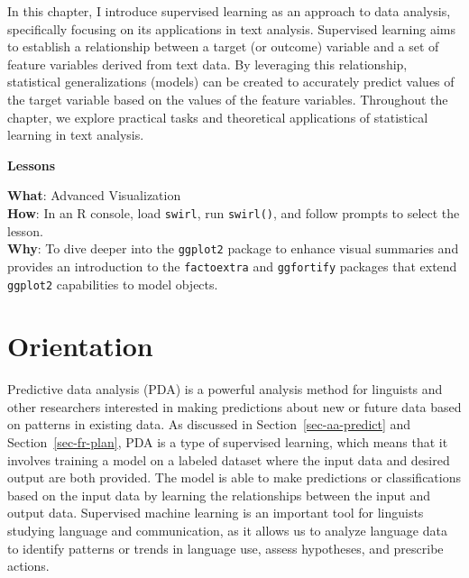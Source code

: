 \documentclass[
  letterpaper,
]{latex/krantz}
\theoremstyle{definition}
\theoremstyle{remark}
\begin{document}
In this chapter, I introduce supervised learning as an approach to data
analysis, specifically focusing on its applications in text analysis.
Supervised learning aims to establish a relationship between a target
(or outcome) variable and a set of feature variables derived from text
data. By leveraging this relationship, statistical generalizations
(models) can be created to accurately predict values of the target
variable based on the values of the feature variables. Throughout the
chapter, we explore practical tasks and theoretical applications of
statistical learning in text analysis.

\begin{tcolorbox}[enhanced jigsaw, colframe=quarto-callout-color-frame, breakable, bottomrule=.15mm, arc=.35mm, left=2mm, opacityback=0, rightrule=.15mm, colback=white, toprule=.15mm, leftrule=.75mm]

\textbf{ Lessons}

\textbf{What}: Advanced Visualization\\
\textbf{How}: In an R console, load \texttt{swirl}, run
\texttt{swirl()}, and follow prompts to select the lesson.\\
\textbf{Why}: To dive deeper into the \texttt{ggplot2} package to
enhance visual summaries and provides an introduction to the
\texttt{factoextra} and \texttt{ggfortify} packages that extend
\texttt{ggplot2} capabilities to model objects.

\end{tcolorbox}

\section{Orientation}\label{sec-pda-orientation}

Predictive data analysis (PDA) is a powerful analysis method for
linguists and other researchers interested in making predictions about
new or future data based on patterns in existing data. As discussed in
Section~\ref{sec-aa-predict} and Section~\ref{sec-fr-plan}, PDA is a
type of supervised learning, which means that it involves training a
model on a labeled dataset where the input data and desired output are
both provided. The model is able to make predictions or classifications
based on the input data by learning the relationships between the input
and output data. Supervised machine learning is an important tool for
linguists studying language and communication, as it allows us to
analyze language data to identify patterns or trends in language use,
assess hypotheses, and prescribe actions.
\end{document}
